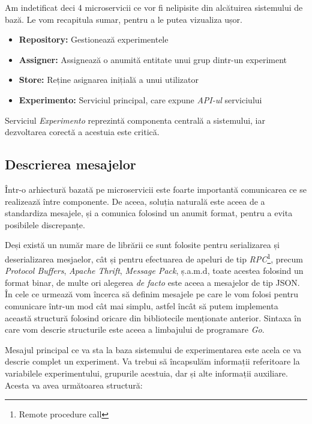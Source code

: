 Am indetificat deci 4 microservicii ce vor fi nelipisite din alcătuirea sistemului de bază. Le vom recapitula sumar, pentru a le putea vizualiza ușor.

\begin{itemize}
	\item \textbf{Repository:} Gestionează experimentele
	\item \textbf{Assigner:} Assignează o anumită entitate unui grup dintr-un experiment
	\item \textbf{Store:} Reține asignarea inițială a unui utilizator
	\item \textbf{Experimento:} Serviciul principal, care expune \textit{API-ul} serviciului 
\end{itemize}

\begin{remark}
	Serviciul \textit{Experimento} reprezintă componenta centrală a sistemului, iar dezvoltarea corectă a acestuia este critică.
\end{remark}

\subsection{Descrierea mesajelor}

Într-o arhiectură bazată pe microservicii este foarte importantă comunicarea ce se realizează între componente. De aceea, soluția naturală este aceea de a standardiza mesajele, și a comunica folosind un anumit format, pentru a evita posibilele discrepanțe.

Deși există un număr mare de librării ce sunt folosite pentru serializarea și deserializarea mesjaelor, cât și pentru efectuarea de apeluri de tip \textit{RPC}\footnote{Remote procedure call}, precum \textit{Protocol Buffers}, \textit{Apache Thrift}, \textit{Message Pack}, ș.a.m.d, toate acestea folosind un format binar, de multe ori alegerea \textit{de facto} este aceea a mesajelor de tip JSON. În cele ce urmează vom încerca să definim mesajele pe care le vom folosi pentru comunicare într-un mod cât mai simplu, astfel încât să putem implementa această structură folosind oricare din bibliotecile menționate anterior. Sintaxa în care vom descrie structurile este aceea a limbajului de programare \textit{Go}.

Mesajul principal ce va sta la baza sistemului de experimentarea este acela ce va descrie complet un experiment. Va trebui să încapsulăm informații referitoare la variabilele experimentului, grupurile acestuia, dar și alte informații auxiliare. Acesta va avea următoarea structură:

